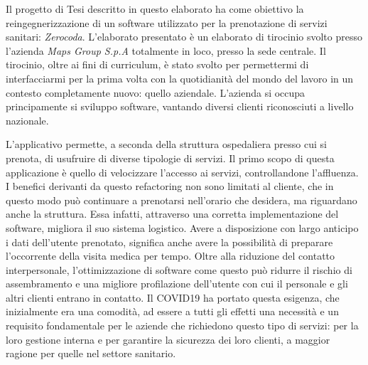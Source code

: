 \documentclass[a4paper,11pt]{article}
\begin{document}
	\maketitle
	   Il progetto di Tesi descritto in questo elaborato ha come obiettivo la reingegnerizzazione di un software utilizzato per la prenotazione di servizi sanitari: \emph{Zerocoda}. L'elaborato presentato è un elaborato di tirocinio svolto presso l'azienda \emph{Maps Group S.p.A} totalmente in loco, presso la sede centrale. Il tirocinio, oltre ai fini di curriculum, è stato svolto per permettermi di interfacciarmi per la prima volta con la quotidianità del mondo del lavoro in un contesto completamente nuovo: quello aziendale. L'azienda si occupa principamente si sviluppo software, vantando diversi clienti riconosciuti a livello nazionale.
	   
	   L'applicativo permette, a seconda della struttura ospedaliera presso cui si prenota, di usufruire di diverse tipologie di servizi. Il primo scopo di questa applicazione è quello di velocizzare l'accesso ai servizi, controllandone l’affluenza. I benefici derivanti da questo refactoring non sono limitati al cliente, che in questo modo può continuare a prenotarsi nell'orario che desidera, ma riguardano anche la struttura. Essa infatti, attraverso una corretta implementazione del software, migliora il suo sistema logistico. Avere a disposizione con largo anticipo i dati dell'utente prenotato, significa anche avere la possibilità di preparare l'occorrente della visita medica per tempo. Oltre alla riduzione del contatto interpersonale, l’ottimizzazione di software come questo può ridurre il rischio di assembramento e una migliore profilazione dell’utente con cui il personale e gli altri clienti entrano in contatto. Il COVID19 ha portato questa esigenza, che inizialmente era una comodità, ad essere a tutti gli effetti una necessità e un requisito fondamentale per le aziende che richiedono questo tipo di servizi: per la loro gestione interna e per garantire la sicurezza dei loro clienti, a maggior ragione per quelle nel settore sanitario. 
	   
\end{document}
